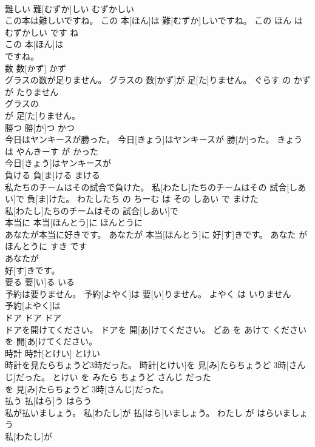 \documentclass[8pt]{extreport}
\begin{document}
\begin{CJK}{UTF8}{min}
\\	難しい	難[むずか]しい	むずかしい	
\\	この本は難しいですね。	この 本[ほん]は 難[むずか]しいですね。	この ほん は むずかしい です ね	
\\	この 本[ほん]は
\\	ですね。		
\\	数	数[かず]	かず	
\\	グラスの数が足りません。	グラスの 数[かず]が 足[た]りません。	ぐらす の かず が たりません	
\\	グラスの
\\	が 足[た]りません。		
\\	勝つ	勝[か]つ	かつ	
\\	今日はヤンキースが勝った。	今日[きょう]はヤンキースが 勝[か]った。	きょう は やんきーす が かった	
\\	今日[きょう]はヤンキースが
\\	負ける	負[ま]ける	まける	
\\	私たちのチームはその試合で負けた。	私[わたし]たちのチームはその 試合[しあい]で 負[ま]けた。	わたしたち の ちーむ は その しあい で まけた	
\\	私[わたし]たちのチームはその 試合[しあい]で
\\	本当に	本当[ほんとう]に	ほんとうに	
\\	あなたが本当に好きです。	あなたが 本当[ほんとう]に 好[す]きです。	あなた が ほんとうに すき です	
\\	あなたが
\\	好[す]きです。		
\\	要る	要[い]る	いる	
\\	予約は要りません。	予約[よやく]は 要[い]りません。	よやく は いりません	
\\	予約[よやく]は
\\	ドア	ドア	ドア	
\\	ドアを開けてください。	ドアを 開[あ]けてください。	どあ を あけて ください	
\\	を 開[あ]けてください。		
\\	時計	時計[とけい]	とけい	
\\	時計を見たらちょうど3時だった。	時計[とけい]を 見[み]たらちょうど 3時[さんじ]だった。	とけい を みたら ちょうど さんじ だった	
\\	を 見[み]たらちょうど 3時[さんじ]だった。		
\\	払う	払[はら]う	はらう	
\\	私が払いましょう。	私[わたし]が 払[はら]いましょう。	わたし が はらいましょう	
\\	私[わたし]が

\end{CJK}
\end{document}
